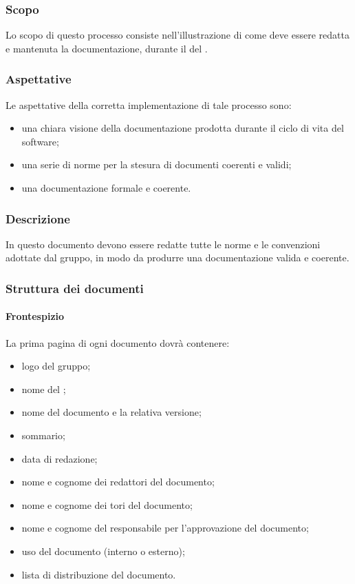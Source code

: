 \subsubsection{Scopo}
Lo scopo di questo processo consiste nell'illustrazione di come deve essere redatta e mantenuta
la documentazione, durante il  del .
\subsubsection{Aspettative}
Le aspettative della corretta implementazione di tale processo sono:
\begin{itemize}
	\item una chiara visione della documentazione prodotta durante il ciclo di vita
del software;
	\item una serie di norme per la stesura di documenti coerenti e validi;
	\item una documentazione formale e coerente.
\end{itemize}
\subsubsection{Descrizione}
In questo documento devono essere redatte tutte le norme e le convenzioni adottate dal gruppo,
in modo da produrre una documentazione valida e coerente.
\subsubsection{Struttura dei documenti}
 \paragraph{Frontespizio}
La prima pagina di ogni documento dovrà contenere:
\begin{itemize}
	\item logo del gruppo;
	\item nome del ;
	\item nome del documento e la relativa versione;
	\item sommario;
	\item data di redazione;
	\item nome e cognome dei redattori del documento;
	\item nome e cognome dei tori del documento;
	\item nome e cognome del responsabile per l'approvazione del documento;
	\item uso del documento (interno o esterno);
	\item lista di distribuzione del documento.
\end{itemize}
